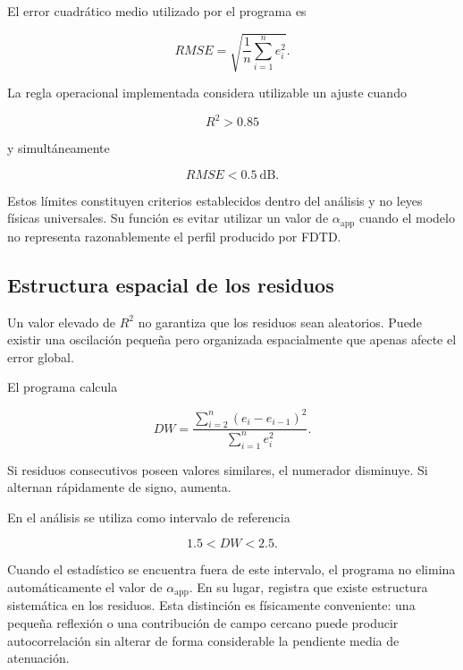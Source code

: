 El error cuadrático medio utilizado por el programa es

\begin{equation}
RMSE
=
\sqrt{
\frac{1}{n}
\sum_{i=1}^{n}
e_i^2
}.
\label{eq:RMSE}
\end{equation}

La regla operacional implementada considera utilizable un ajuste cuando

\begin{equation}
R^2>0.85
\end{equation}

y simultáneamente

\begin{equation}
RMSE<0.5~\mathrm{dB}.
\end{equation}

Estos límites constituyen criterios establecidos dentro del análisis y no leyes físicas universales. Su función es evitar utilizar un valor de $\alpha_{\mathrm{app}}$ cuando el modelo no representa razonablemente el perfil producido por FDTD.

\subsection{Estructura espacial de los residuos}

Un valor elevado de $R^2$ no garantiza que los residuos sean aleatorios. Puede existir una oscilación pequeña pero organizada espacialmente que apenas afecte el error global.

El programa calcula

\begin{equation}
DW
=
\frac{
\displaystyle
\sum_{i=2}^{n}
(e_i-e_{i-1})^2
}{
\displaystyle
\sum_{i=1}^{n}e_i^2
}.
\label{eq:DW}
\end{equation}

Si residuos consecutivos poseen valores similares, el numerador disminuye. Si alternan rápidamente de signo, aumenta.

En el análisis se utiliza como intervalo de referencia

\begin{equation}
1.5<DW<2.5.
\end{equation}

Cuando el estadístico se encuentra fuera de este intervalo, el programa no elimina automáticamente el valor de $\alpha_{\mathrm{app}}$. En su lugar, registra que existe estructura sistemática en los residuos. Esta distinción es físicamente conveniente: una pequeña reflexión o una contribución de campo cercano puede producir autocorrelación sin alterar de forma considerable la pendiente media de atenuación.

